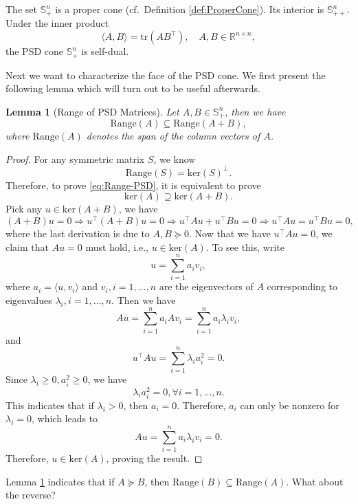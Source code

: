 \documentclass[
]{book}
\newtheorem{lemma}{Lemma}[chapter]
\theoremstyle{definition}
\theoremstyle{definition}
\theoremstyle{definition}
\theoremstyle{definition}
\theoremstyle{remark}
\begin{document}
The set \(\mathbb{S}^{n}_{+}\) is a proper cone (cf.~Definition \ref{def:ProperCone}). Its interior is \(\mathbb{S}^{n}_{++}\). Under the inner product
\[
\langle A, B \rangle = \mathrm{tr}(AB^\top), \quad A,B \in \mathbb{R}^{n \times n},
\]
the PSD cone \(\mathbb{S}^{n}_{+}\) is self-dual.

Next we want to characterize the face of the PSD cone. We first present the following lemma which will turn out to be useful afterwards.

\begin{lemma}[Range of PSD Matrices]
\protect\hypertarget{lem:PSDRange}{}\label{lem:PSDRange}Let \(A,B \in \mathbb{S}^{n}_{+}\), then we have
\begin{equation}
\mathrm{Range}(A) \subseteq \mathrm{Range}(A + B),
\label{eq:Range-PSD}
\end{equation}
where \(\mathrm{Range}(A)\) denotes the span of the column vectors of \(A\).
\end{lemma}

\begin{proof}
For any symmetric matrix \(S\), we know
\[
\mathrm{Range}(S) = \mathrm{ker}(S)^{\perp}.
\]
Therefore, to prove \eqref{eq:Range-PSD}, it is equivalent to prove
\[
\mathrm{ker}(A) \supseteq \mathrm{ker}(A + B).
\]
Pick any \(u \in \mathrm{ker}(A + B)\), we have
\[
(A + B) u = 0 \Rightarrow u ^\top(A + B) u = 0 \Rightarrow u^\top A u + u^\top B u = 0 \Rightarrow u^\top A u = u^\top B u = 0,
\]
where the last derivation is due to \(A, B \succeq 0\). Now that we have \(u^\top A u = 0\), we claim that \(Au = 0\) must hold, i.e., \(u \in \mathrm{ker}(A)\). To see this, write
\[
u = \sum_{i=1}^n a_i v_i,
\]
where \(a_i = \langle u, v_i \rangle\) and \(v_i,i=1,\dots,n\) are the eigenvectors of \(A\) corresponding to eigenvalues \(\lambda_i,i=1,\dots,n\). Then we have
\[
Au = \sum_{i=1}^n a_i A v_i = \sum_{i=1}^n a_i \lambda_i v_i,
\]
and
\[
u^\top A u = \sum_{i=1}^n \lambda_i a_i^2 = 0.
\]
Since \(\lambda_i \geq 0, a_i^2 \geq 0\), we have
\[
\lambda_i a_i^2 = 0, \forall i = 1,\dots,n.
\]
This indicates that if \(\lambda_i > 0\), then \(a_i = 0\). Therefore, \(a_i\) can only be nonzero for \(\lambda_i = 0\), which leads to
\[
Au = \sum_{i=1}^n a_i \lambda_i v_i = 0.
\]
Therefore, \(u \in \mathrm{ker}(A)\), proving the result.
\end{proof}

Lemma \ref{lem:PSDRange} indicates that if \(A \succeq B\), then \(\mathrm{Range}(B) \subseteq \mathrm{Range}(A)\). What about the reverse?
\end{document}
